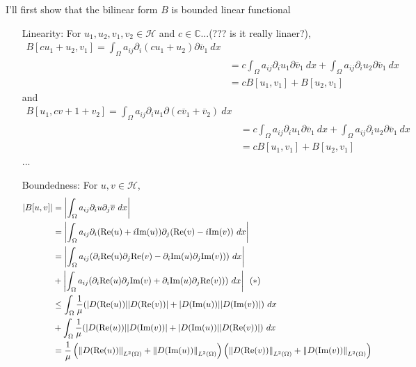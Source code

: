 \documentclass{article}
\begin{document}
\begin{enumerate}
I'll first show that the bilinear form $B$ is bounded linear functional
\begin{enumerate}
\item[Linearity:] For $u_1,u_2,v_1,v_2\in \mathcal{H}$ and $c\in \mathbb{C}$...(??? is it really linaer?),
\begin{equation*}
\begin{split}
B[cu_1+u_2,v_1]=\int_\Omega a_{ij}\partial_i (cu_1+u_2)\partial \overline{v}_1~dx \\
&=c\int_\Omega a_{ij}\partial_i u_1\partial \overline{v}_1~dx+\int_\Omega a_{ij}\partial_i u_2\partial \overline{v}_1~dx \\
&=cB[u_1,v_1]+B[u_2,v_1]
\end{split}
\end{equation*}
and
\begin{equation*}
\begin{split}
B[u_1,cv+1+v_2]=\int_\Omega a_{ij}\partial_i u_1\partial (c\overline{v}_1+\overline{v}_2)~dx \\
&=c\int_\Omega a_{ij}\partial_i u_1\partial \overline{v}_1~dx+\int_\Omega a_{ij}\partial_i u_2\partial \overline{v}_1~dx \\
&=cB[u_1,v_1]+B[u_2,v_1]
\end{split}
\end{equation*}
...
\item[Boundedness:]  For $u,v\in \mathcal{H}$,
\begin{equation*}
\begin{split}
\abs{B[u,v]}&=\abs{\int_\Omega a_{ij}\partial_i u\partial_j \overline{v}~dx} \\
&=\abs{\int_\Omega a_{ij}\partial_i (\text{Re}(u)+i\text{Im}(u))\partial_j (\text{Re}(v)-i\text{Im}(v))~dx} \\
&=\abs{\int_\Omega a_{ij} (\partial_i\text{Re}(u)\partial_j\text{Re}(v)-\partial_i\text{Im}(u)\partial_j\text{Im}(v)))~dx}\\
&+\abs{\int_\Omega a_{ij} (\partial_i\text{Re}(u)\partial_j\text{Im}(v)+\partial_i\text{Im}(u)\partial_j\text{Re}(v)))~dx}~~(*)\\
&\leq\int_\Omega \frac{1}{\mu} (\abs{D(\text{Re}(u))}\abs{D(\text{Re}(v))}+\abs{D(\text{Im}(u))}\abs{D(\text{Im}(v))})~dx\\
&+\int_\Omega \frac{1}{\mu} (\abs{D(\text{Re}(u))}\abs{D(\text{Im}(v))}+\abs{D(\text{Im}(u))}\abs{D(\text{Re}(v))})~dx\\
&=\frac{1}{\mu}\left(\norm{D(\text{Re}(u))}_{L^2(\Omega)}+\norm{D(\text{Im}(u))}_{L^2(\Omega)}\right)\left(\norm{D(\text{Re}(v))}_{L^2(\Omega)}+\norm{D(\text{Im}(v))}_{L^2(\Omega)}\right) \\

\end{split}
\end{equation*}
\end{enumerate}
\end{enumerate}
\end{document}
